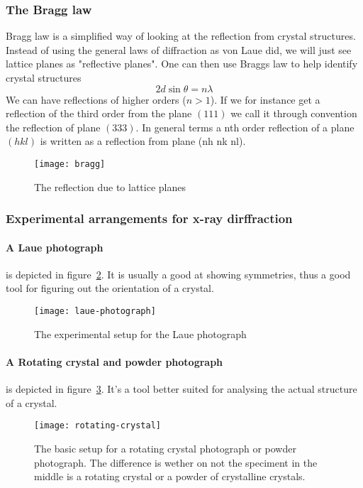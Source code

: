 \documentclass[11pt]{article}
\begin{document}
\subsubsection{The Bragg  law}
Bragg law is a simplified way of looking at the reflection from crystal structures. Instead of using the general laws of diffraction as von Laue did, we will just see lattice planes as "reflective planes". One can then use Braggs law to help identify crystal structures
\begin{equation}
	2d\sin{\theta} = n\lambda
\end{equation}
We can have reflections of higher orders ($n>1$). If we for instance get a reflection of the third order from the plane $(111)$ we call it through convention the reflection of plane $(333)$. In general terms a nth order reflection of a plane $(hkl)$ is written as a reflection from plane (nh nk nl).

\begin{figure}[H]
	\centering
	\texttt{[image: bragg]}
	\caption{The reflection due to lattice planes}
	\label{fig:bragg-law}
\end{figure}

\subsubsection{Experimental arrangements for x-ray dirffraction}
\newpage
\paragraph{A Laue photograph} is depicted in figure~\ref{fig:laue-photograph}. It is usually a good at showing symmetries, thus a good tool for figuring out the orientation of a crystal.
\begin{figure}[!ht]
	\centering
	\texttt{[image: laue-photograph]}
	\caption{The experimental setup for the Laue photograph}
	\label{fig:laue-photograph}
\end{figure}

\newpage
\paragraph{A Rotating crystal and powder photograph} is depicted in figure~\ref{fig:rotating-crystal}. It's a tool better suited for analysing the actual structure of a crystal.
\begin{figure}[!ht]
	\centering
	\texttt{[image: rotating-crystal]}
	\caption{The basic setup for a rotating crystal photograph or powder photograph. The difference is wether on not the speciment in the middle is a rotating crystal or a powder of crystalline crystals.}
	\label{fig:rotating-crystal}
\end{figure}
\end{document}
